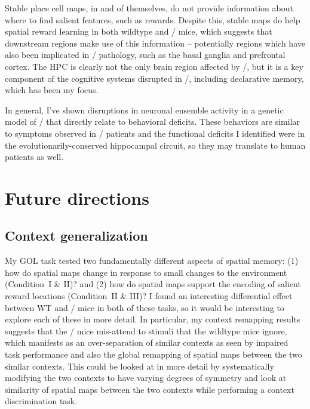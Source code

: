Stable place cell maps, in and of themselves, do not provide information about where to find salient features, such as rewards. Despite this, stable maps do help spatial reward learning in both wildtype and \df/ mice, which suggests that downstream regions make use of this information -- potentially regions which have also been implicated in \scz/ pathology, such as the basal ganglia and prefrontal cortex. The \ac{HPC} is clearly not the only brain region affected by \scz/, but it is a key component of the cognitive systems disrupted in \scz/, including declarative memory, which has been my focus.

In general, I've shown disruptions in neuronal ensemble activity in a genetic model of \scz/ that directly relate to behavioral deficits.
These behaviors are similar to symptoms observed in \scz/ patients and the functional deficits I identified were in the evolutionarily-conserved hippocampal circuit, so they may translate to human patients as well.


\section{Future directions}

\subsection{Context generalization}
My \ac{GOL} task tested two fundamentally different aspects of spatial memory:
(1) how do spatial maps change in response to small changes to the environment (Condition~I \& II)? and
(2) how do spatial maps support the encoding of salient reward locations (Condition~II \& III)?
I found an interesting differential effect between WT and \df/ mice in both of these tasks, so it would be interesting to explore each of these in more detail.
In particular, my context remapping results suggests that the \df/ mice mis-attend to stimuli that the wildtype mice ignore, which manifests as an over-separation of similar contexts as seen by impaired task performance and also the global remapping of spatial maps between the two similar contexts.
This could be looked at in more detail by systematically modifying the two contexts to have varying degrees of symmetry and look at similarity of spatial maps between the two contexts while performing a context discrimination task.

